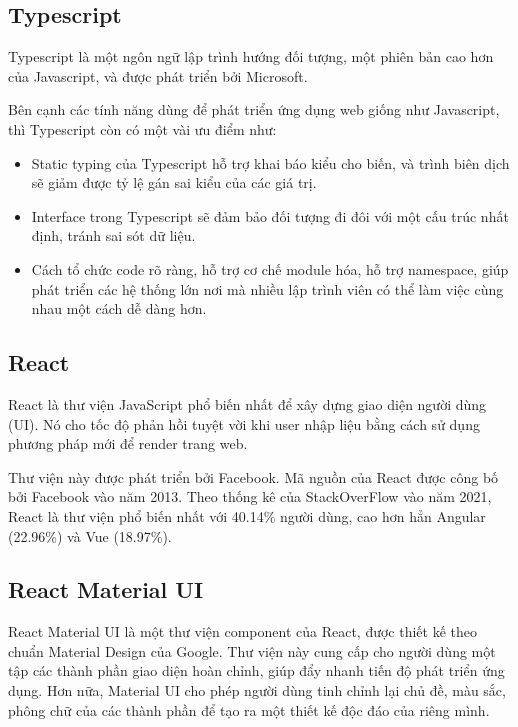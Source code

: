 \documentclass[./../main.tex]{subfiles}
\begin{document}
\hypertarget{typescript}{%
\subsection{Typescript}\label{typescript}}

Typescript \cite{Type22} là một ngôn ngữ lập trình hướng đối tượng, một phiên bản cao hơn của Javascript, và được phát triển bởi Microsoft.

Bên cạnh các tính năng dùng để phát triển ứng dụng web  giống như Javascript, thì Typescript còn có một vài ưu điểm như:

\begin{itemize}
  \item
    
  Static typing của Typescript hỗ trợ khai báo kiểu cho biến, và trình biên dịch sẽ giảm được tỷ lệ gán sai kiểu của các giá trị.
    
  \item
  Interface trong Typescript sẽ đảm bảo đối tượng đi đôi với một cấu trúc nhất định, tránh sai sót dữ liệu.
    
  \item
  Cách tổ chức code rõ ràng, hỗ trợ cơ chế module hóa, hỗ trợ namespace, giúp phát triển các hệ thống lớn nơi mà nhiều lập trình viên có thể làm việc cùng nhau một cách dễ dàng hơn.

\end{itemize}

\hypertarget{react}{%
\subsection{React}\label{react}}

React \cite{React22} là thư viện JavaScript phổ biến nhất để xây dựng giao diện người
dùng (UI). Nó cho tốc độ phản hồi tuyệt vời khi user nhập liệu bằng cách
sử dụng phương pháp mới để render trang web.

Thư viện này được phát triển bởi Facebook. Mã nguồn của React được công
bố bởi Facebook vào năm 2013. Theo thống kê của StackOverFlow vào năm
2021, React là thư viện phổ biến nhất với 40.14\% người dùng, cao hơn
hẳn Angular (22.96\%) và Vue (18.97\%).

\hypertarget{react-material-ui}{%
\subsection{React Material UI}\label{react-material-ui}}

React Material UI \cite{MUI22} là một thư viện component của React, được thiết kế
theo chuẩn Material Design của Google. Thư viện này cung cấp cho người
dùng một tập các thành phần giao diện hoàn chỉnh, giúp đẩy nhanh tiến độ
phát triển ứng dụng. Hơn nữa, Material UI cho phép người dùng tinh chỉnh
lại chủ đề, màu sắc, phông chữ của các thành phần để tạo ra một thiết kế
độc đáo của riêng mình.
\end{document}
